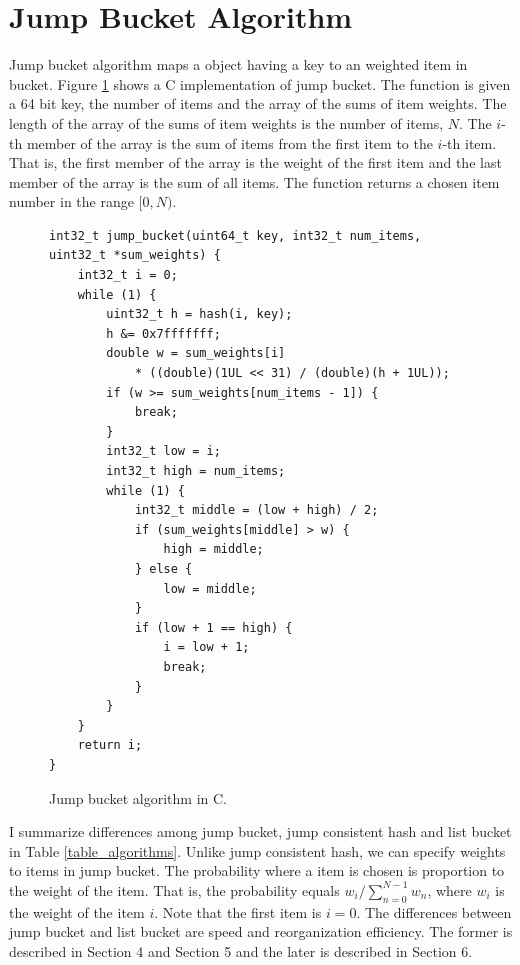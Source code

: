 \documentclass[a4paper,11pt]{article}
\begin{document}
\section{Jump Bucket Algorithm}

Jump bucket algorithm maps a object having a key to an weighted item in bucket.
Figure \ref{code_jumpbucket} shows a C implementation of jump bucket.
The function is given a 64 bit key, the number of items and the array of the sums of item weights.
The length of the array of the sums of item weights is the number of items, $N$.
The $i$-th member of the array is the sum of items from the first item to the $i$-th item.
That is, the first member of the array is the weight of the first item and the last member of the array is the sum of all items.
The function returns a chosen item number in the range $[0, N)$.

\begin{figure}[tbp]
\lstset{language=C}
\begin{footnotesize}
\begin{lstlisting}[frame=single]
int32_t jump_bucket(uint64_t key, int32_t num_items, uint32_t *sum_weights) {
    int32_t i = 0;
    while (1) {
        uint32_t h = hash(i, key);
        h &= 0x7fffffff;
        double w = sum_weights[i]
            * ((double)(1UL << 31) / (double)(h + 1UL));
        if (w >= sum_weights[num_items - 1]) {
            break;
        }
        int32_t low = i;
        int32_t high = num_items;
        while (1) {
            int32_t middle = (low + high) / 2;
            if (sum_weights[middle] > w) {
                high = middle;
            } else {
                low = middle;
            }
            if (low + 1 == high) {
                i = low + 1;
                break;
            }
        }
    }
    return i;
}
\end{lstlisting}
\end{footnotesize}
\caption{Jump bucket algorithm in C.}
\label{code_jumpbucket}
\end{figure}

I summarize differences among jump bucket, jump consistent hash and list bucket in Table \ref{table_algorithms}.
Unlike jump consistent hash, we can specify weights to items in jump bucket.
The probability where a item is chosen is proportion to the weight of the item.
That is, the probability equals $w_i / \sum_{n=0}^{N-1} w_n$, where $w_i$ is the weight of the item $i$.
Note that the first item is $i=0$.
The differences between jump bucket and list bucket are speed and reorganization efficiency.
The former is described in Section 4 and Section 5 and the later is described in Section 6.
\end{document}
